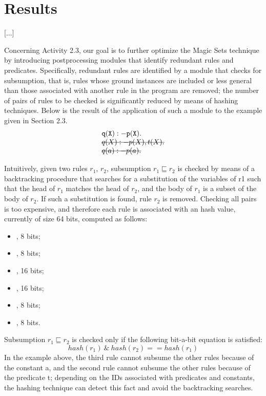 \documentclass[oneside]{book}
\newcommand{\stkout}[1]{\ifmmode\text{\sout{\ensuremath{#1}}}\else\sout{#1}\fi}
\begin{document}
\chapter{Results}
[...]

Concerning Activity 2.3, our goal is to further optimize the Magic Sets technique by introducing postprocessing modules that identify redundant rules and predicates. Specifically, redundant rules are identified by a module that checks for subsumption, that is, rules whose ground instances are included or less general than those associated with another rule in the program are removed; the number of pairs of rules to be checked is significantly reduced by means of hashing techniques. Below is the result of the application of such a module to the example given in Section 2.3. 
\[
\begin{array}{l}
{\tt q(X) :- p(X).}\\
\mathtt{\stkout{q(X) :- p(X), t(X).}}\\
\mathtt{\stkout{ q(a) :- p(a).}}\\
\end{array}
\]


Intuitively, given two rules $r_1$, $r_2$, subsumption $r_1 \sqsubseteq r_2$ is checked by means of a backtracking procedure that searches for a substitution of the variables of r1 such that the head of $r_1$ matches the head of $r_2$, and the body of $r_1$ is a subset of the body of $r_2$. If such a substitution is found, rule  $r_2$ is removed. Checking all pairs is too expensive, and therefore each rule is associated with an hash value, currently of size 64 bits, computed as follows:
\begin{itemize}
\item <OR of IDs of head predicates>, 8 bits;
\item <OR of IDs of head constants>, 8 bits;
\item <OR of IDs of predicates in positive body>, 16 bits;
\item <OR of IDs of constants in positive body>, 16 bits;
\item <OR of IDs of predicates in negative body>, 8 bits;
\item <OR of IDs of constants in negative body>, 8 bits.
\end{itemize}
Subsumption $r_1 \sqsubseteq r_2$ is checked only if the following bit-a-bit equation is satisfied:
$$hash(r_1) \ \& \ hash(r_2) == hash(r_1)$$
In the example above, the third rule cannot subsume the other rules because of the constant a, and the second rule cannot subsume the other rules because of the predicate t; depending on the IDs associated with predicates and constants, the hashing technique can detect this fact and avoid the backtracking searches.
\end{document}
